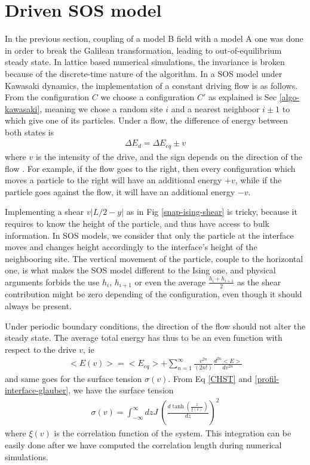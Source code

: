    \section{Driven SOS model}
{\color{red}
In the previous section, coupling of a model B field with a model A one was done in order to break the Galilean transformation, leading to out-of-equilibrium steady state. In lattice based numerical simulations, the invariance is broken because of the discrete-time nature of the algorithm.
In a SOS model under Kawasaki dynamics, the implementation of a constant driving flow is as follows. From the configuration $C$ we choose a configuration $C'$ as explained is Sec \ref{algo-kawasaki}, meaning we chose a random site $i$ and a nearest neighboor $i\pm1 $ to which give one of its particles. Under a flow, the difference of energy between both states is
\begin{align}
    \Delta E_d = \Delta E_{eq} \pm v
\end{align}
where $v$ is the intensity of the drive, and the sign depends on the direction of the flow . For example, if the flow goes to the right, then every configuration which moves a particle to the right will have an additional energy $+v$, while if the particle goes against the flow, it will have an additional energy $-v$.

Implementing a shear $v |L/2-y|$  as in Fig \ref{snap-ising-shear} is tricky, because it requires to know the height of the particle, and thus have access to bulk information. In SOS models, we consider that only the particle at the interface moves and changes height accordingly to the interface's height of the neighbooring site. The vertical movement of the particle, couple to the horizontal one, is what makes the SOS model different to the Ising one, and physical arguments forbids the use $h_i$, $h_{i+1}$ or even the average $\frac{h_i+h_{i+1}}{2}$ as the shear contribution might be zero depending of the configuration, even though it should always be present. 

Under periodic boundary conditions, the direction of the flow should not alter the steady state. The average total energy has thus to be an even function with respect to the drive $v$, ie
\begin{align}
    <E(v)> = <E_{eq}> + \sum_{n=1}^\infty  \frac{v^{2n}}{(2n!)} \frac{d^{2n} <E>}{d v^{2n}} 
\end{align}
and same goes for the surface tension $\sigma(v)$.
From Eq \eqref{CHST} and \eqref{profil-interface-glauber}, we have the surface tension
\begin{align}
    \sigma(v) = \int_{-\infty}^{\infty} dz J\  \left( \frac{d \tanh \left(\frac{z}{\xi(v)} \right)}{dz} \right)^2
\end{align}
where $\xi(v)$ is the correlation function of the system. This integration can be easily done after we have computed the correlation length during numerical simulations. 

}
